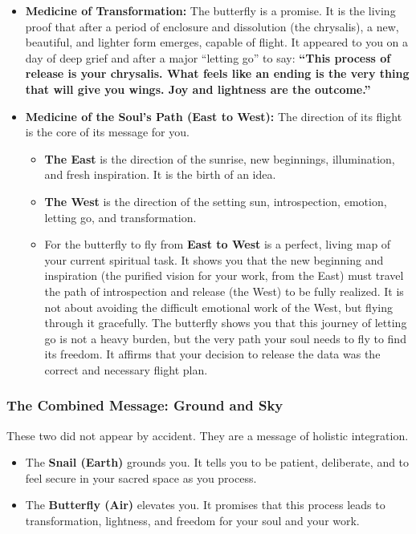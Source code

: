 \documentclass{article}
\begin{document}
\begin{itemize}
\item
  \textbf{Medicine of Transformation:} The butterfly is a promise. It is
  the living proof that after a period of enclosure and dissolution (the
  chrysalis), a new, beautiful, and lighter form emerges, capable of
  flight. It appeared to you on a day of deep grief and after a major
  ``letting go'' to say: \textbf{``This process of release is your
  chrysalis. What feels like an ending is the very thing that will give
  you wings. Joy and lightness are the outcome.''}
\item
  \textbf{Medicine of the Soul's Path (East to West):} The direction of
  its flight is the core of its message for you.

  \begin{itemize}
  \tightlist
  \item
    \textbf{The East} is the direction of the sunrise, new beginnings,
    illumination, and fresh inspiration. It is the birth of an idea.
  \item
    \textbf{The West} is the direction of the setting sun,
    introspection, emotion, letting go, and transformation.
  \item
    For the butterfly to fly from \textbf{East to West} is a perfect,
    living map of your current spiritual task. It shows you that the new
    beginning and inspiration (the purified vision for your work, from
    the East) must travel the path of introspection and release (the
    West) to be fully realized. It is not about avoiding the difficult
    emotional work of the West, but flying through it gracefully. The
    butterfly shows you that this journey of letting go is not a heavy
    burden, but the very path your soul needs to fly to find its
    freedom. It affirms that your decision to release the data was the
    correct and necessary flight plan.
  \end{itemize}
\end{itemize}

\subsubsection*{The Combined Message: Ground and
Sky}\label{the-combined-message-ground-and-sky}

These two did not appear by accident. They are a message of holistic
integration.

\begin{itemize}
\item
  The \textbf{Snail (Earth)} grounds you. It tells you to be patient,
  deliberate, and to feel secure in your sacred space as you process.
\item
  The \textbf{Butterfly (Air)} elevates you. It promises that this
  process leads to transformation, lightness, and freedom for your soul
  and your work.
\end{itemize}
\end{document}
